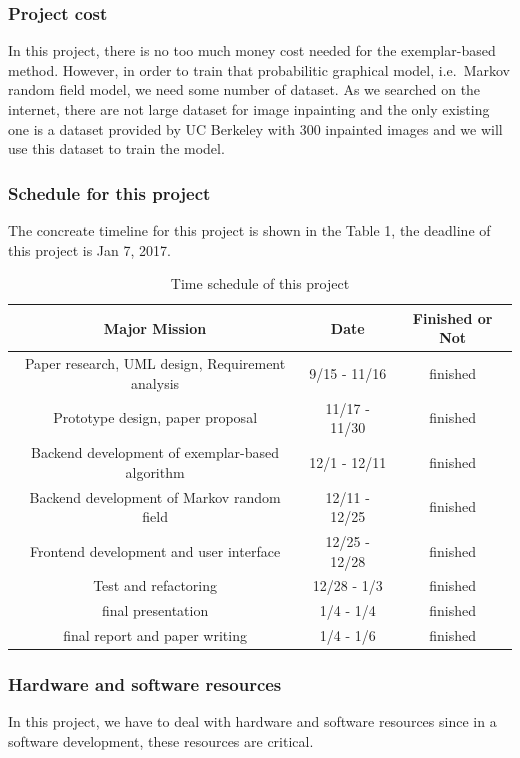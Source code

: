 \subsubsection{Project cost}
In this project, there is no too much money cost needed for the 
exemplar-based method. However, in order to train that probabilitic
graphical model, i.e.\ Markov random field model, we need some number
of dataset. As we searched on the internet, there are not large dataset
for image inpainting and the only existing one is a dataset provided by
UC Berkeley with 300 inpainted images and we will use this dataset to
train the model.
\subsubsection{Schedule for this project}
The concreate timeline for this project is shown in the Table 1,
the deadline of this project is Jan 7, 2017.
\begin{table}
\hspace{-1cm}
\begin{tabular}{|c|c|c|}
\hline
Major Mission & Date & Finished or Not \\
\hline
Paper research, UML design, Requirement analysis
& 9/15 - 11/16& finished \\
\hline
Prototype design, paper proposal & 11/17 - 11/30 & finished \\
\hline
Backend development of exemplar-based algorithm & 12/1 - 12/11 & finished\\
\hline
Backend development of Markov random field & 12/11 - 12/25 & finished\\
\hline
Frontend development and user interface & 12/25 - 12/28 & finished\\
\hline
Test and refactoring & 12/28 - 1/3 &finished\\
\hline 
    final presentation & 1/4 - 1/4 & finished \\ \hline
    final report and paper writing & 1/4 - 1/6 & finished \\ \hline
\end{tabular}
\caption{Time schedule of this project}
\end{table}
\subsubsection{Hardware and software resources}
In this project, we have to deal with hardware and software resources since 
in a software development, these resources are critical.


